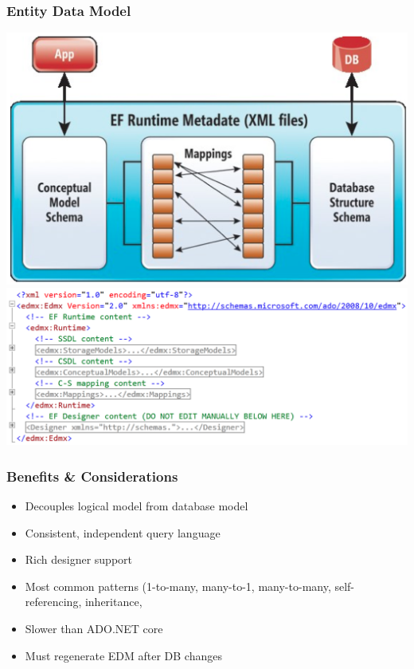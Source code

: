\documentclass[10pt]{article}
\begin{document}
\subsubsection{Entity Data Model}
\begin{center}
\includegraphics[scale=0.4]{entity_data_model_1.png}
\includegraphics[scale=0.4]{entity_data_model_2.png}
\end{center}
\subsubsection{Benefits \& Considerations}
\begin{itemize}
	\item Decouples logical model from database model
	\item Consistent, independent query language
	\item Rich designer support
	\item Most common patterns (1-to-many, many-to-1, many-to-many, self-referencing, inheritance,
	\item Slower than ADO.NET core
	\item Must regenerate EDM after DB changes
\end{itemize}
\end{document}
